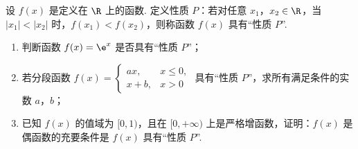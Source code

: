 \documentclass[UTF8,a4paper,oneside,11pt]{ctexbook}
\begin{document}
\begin{problem}
设 \(f(x)\) 是定义在 \(\R\) 上的函数. 定义性质 \(P\)：若对任意 \(x_1\)，\(x_2\in\R\)，当 \(|x_1|<|x_2|\) 时，\(f(x_1)<f(x_2)\)，则称函数 \(f(x)\) 具有“性质 \(P\)”.

\begin{enumerate}
\item 判断函数 \(f(x)=\e^x\) 是否具有“性质 \(P\)”；
\item 若分段函数
\(
f(x)=
\begin{cases}
ax,&x\le0,\\
x+b,&x>0
\end{cases}
\)
具有“性质 \(P\)”，求所有满足条件的实数 \(a\)，\(b\)；
\item 已知 \(f(x)\) 的值域为 \([0,1)\)，且在 \([0,+\infty)\) 上是严格增函数，证明：\(f(x)\) 是偶函数的充要条件是 \(f(x)\) 具有“性质 \(P\)”.
\end{enumerate}
\end{problem}
\end{document}
